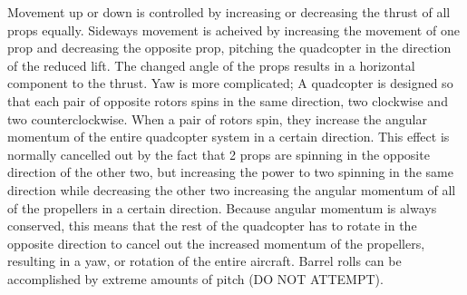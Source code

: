 \documentclass[11pt]{article} %
\begin{document}
Movement up or down is controlled by increasing or decreasing the thrust of all props equally. Sideways movement is acheived by increasing the movement of one prop and decreasing the opposite prop, pitching the quadcopter in the direction of the reduced lift. The changed angle of the props results in a horizontal component to the thrust. Yaw is more complicated; A quadcopter is designed so that each pair of opposite rotors spins in the same direction, two clockwise and two counterclockwise. When a pair of rotors spin, they increase the angular momentum of the entire quadcopter system in a certain direction. This effect is normally cancelled out by the fact that 2 props are spinning in the opposite direction of the other two, but increasing the power to two spinning in the same direction while decreasing the other two increasing the angular momentum of all of the propellers in a certain direction. Because angular momentum is always conserved, this means that the rest of the quadcopter has to rotate in the opposite direction to cancel out the increased momentum of the propellers, resulting in a yaw, or rotation of the entire aircraft. Barrel rolls can be accomplished by extreme amounts of pitch (DO NOT ATTEMPT).
\end{document}
